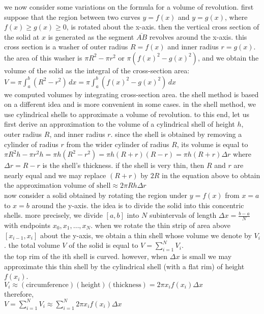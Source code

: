 \documentclass{article}
\begin{document}
we now consider some variations on the formula for a volume of revolution. first suppose that the region between two curves $y = f(x)$ and $y = g(x)$, where $f(x) \geq g(x) \geq 0$, is rotated about the x-axis. then the vertical cross section of the solid at $x$ is generated as the segment $\overline{AB}$ revolves around the x-axis. this cross section is a washer of outer radius $R = f(x)$ and inner radius $r = g(x)$. the area of this washer is $\pi R^2 - \pi r^2$ or $\pi(f(x)^2 - g(x)^2)$, and we obtain the volume of the solid as the integral of the cross-section area:\\ $V = \pi \int_{a}^{b}(R^2 - r^2)\,dx = \pi \int_{a}^{b}(f(x)^2 - g(x)^2)\,dx$\\

we computed volumes by integrating cross-section area. the shell method is based on a different idea and is more convenient in some cases. in the shell method, we use cylindrical shells to approximate a volume of revolution. to this end, let us first derive an approximation to the volume of a cylindrical shell of height $h$, outer radius $R$, and inner radius $r$. since the shell is obtained by removing a cylinder of radius $r$ from the wider cylinder of radius $R$, its volume is equal to  $\pi R^2h - \pi r^2h = \pi h(R^2 - r^2) = \pi h(R + r)(R - r) = \pi h(R + r)\Delta r$ where $\Delta r = R - r$ is the shell's thickness. if the shell is very thin, then $R$ and $r$ are nearly equal and we may replace $(R + r)$ by $2R$ in the equation above to obtain the approximation $\text{volume of shell} \approx 2\pi Rh\Delta r$\\

now consider a solid obtained by rotating the region under $y = f(x)$ from $x = a$ to $x = b$ around the y-axis. the idea is to divide the solid into this concentric shells. more precisely, we divide $[a, b]$ into $N$ subintervals of length $\Delta x = \frac{b - a}{N}$ with endpoints $x_0, x_1, \ldots, x_N$. when we rotate the thin strip of area above $[x_{i - 1}, x_i]$ about the y-axis, we obtain a thin shell whose volume we denote by $V_i$. the total volume $V$ of the solid is equal to $V = \sum_{i=1}^{N}V_i$.\\

the top rim of the ith shell is curved. however, when $\Delta x$ is small we may approximate this thin shell by the cylindrical shell (with a flat rim) of height $f(x_i)$.\\ $V_i \approx (\text{circumference})(\text{height})(\text{thickness}) = 2\pi x_if(x_i)\Delta x$\\ therefore,\\ $V = \sum_{i=1}^{N}V_i \approx \sum_{i=1}^{N}2\pi x_if(x_i)\Delta x$\\
\end{document}
